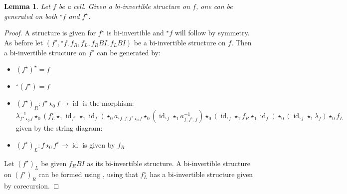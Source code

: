 \documentclass{article}
\newtheorem{lemma}{Lemma}
\theoremstyle{definition}
\theoremstyle{remark}
\DeclareMathOperator{\id}{id}
\newcommand{\linv}[1]{{}^\star\!#1}
\newcommand{\rinv}[1]{#1^\star}
\newcommand{\comp}{\star}
\begin{document}
\begin{lemma}\label{inverses}
  Let \(f\) be a cell. Given a bi-invertible structure on \(f\), one can be generated on both \(\linv f\) and \(\rinv f\).
\end{lemma}
\begin{proof}
  A structure is given for \(\rinv f\) is bi-invertible and \(\linv f\) will follow by symmetry. As before let \((\rinv f, \linv f, f_R, f_L, f_R{}BI, f_L{}BI)\) be a bi-invertible structure on \(f\). Then a bi-invertible structure on \(\rinv f\) can be generated by:
  \begin{itemize}
  \item \(\rinv {(\rinv f)} = f\)
  \item \(\linv {(\rinv f)} = f\)
  \item \({(\rinv f)}_R: \rinv f \comp_0 f \to \id\) is the morphism:
    \begin{equation*}
      \lambda_{\rinv f \comp_0 f}^{-1} \comp_0 (\rinv {f_L} \comp_1 \id_{\rinv f} \comp_1 \id_f) \comp_0 a_{\linv f, f, \rinv f \comp_0 f} \comp_0 (\id_{\linv f} \comp_1 a_{f, \rinv f, f}^{-1}) \comp_0 (\id_{\linv f} \comp_1 f_R \comp_1 \id_f) \comp_0 (\id_{\linv f} \comp_1 \lambda_f) \comp_0 f_L
    \end{equation*}
    given by the string diagram:
    \begin{center}
    \end{center}
  \item \({(\rinv f)}_L: f \comp_0 \rinv f \to \id\) is given by \(f_R\)
  \end{itemize}
  Let \({(\rinv f)}_L\) be given \(f_R{}BI\) as its bi-invertible structure. A bi-invertible structure on \({(\rinv f)}_R\) can be formed using , using that \(\rinv {f_L}\) has a bi-invertible structure given by corecursion.
\end{proof}
\end{document}
